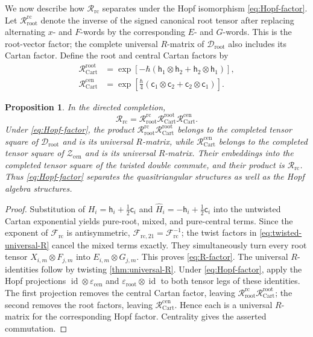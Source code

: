 \documentclass[11pt,a4paper]{article}
\newcommand{\ot}{\otimes}
\newcommand{\id}{\operatorname{id}}
\newcommand{\rc}{\mathrm{rc}}
\newcommand{\cen}{\mathrm{cen}}
\newcommand{\rootpart}{\mathrm{root}}
\newtheorem{proposition}[theorem]{Proposition}
\theoremstyle{definition}
\theoremstyle{remark}
\begin{document}
We now describe how \(\mathcal R_{\rc}\) separates under the Hopf
isomorphism \eqref{eq:Hopf-factor}.
Let \(\mathcal R_{\rootpart}^{\rc}\) denote the inverse of the signed
canonical root tensor after replacing alternating \(x\)- and \(F\)-words
by the corresponding \(E\)- and \(G\)-words.  This is the root-vector
factor; the complete universal \(R\)-matrix of
\(\mathcal D_{\rootpart}\) also includes its Cartan factor.
Define the root and central Cartan factors by
\[
\begin{aligned}
 \mathcal R_{\mathrm{Cart}}^{\rootpart}
 &=
 \exp\!\left[-\hbar(
 \mathsf h_1\ot\mathsf h_2+\mathsf h_2\ot\mathsf h_1)\right],\\
 \mathcal R_{\mathrm{Cart}}^{\cen}
 &=
 \exp\!\left[\frac{\hbar}{4}(
 \mathsf c_1\ot\mathsf c_2+\mathsf c_2\ot\mathsf c_1)\right].
\end{aligned}
\]

\begin{proposition}\label{prop:R-factor}
In the directed completion,
\begin{equation}\label{eq:R-factor}
 \mathcal R_{\rc}
 =
 \mathcal R_{\rootpart}^{\rc}
 \mathcal R_{\mathrm{Cart}}^{\rootpart}
 \mathcal R_{\mathrm{Cart}}^{\cen}.
\end{equation}
Under \eqref{eq:Hopf-factor}, the product
\(\mathcal R_{\rootpart}^{\rc}\mathcal R_{\mathrm{Cart}}^{\rootpart}\)
belongs to the completed tensor square of \(\mathcal D_{\rootpart}\)
and is its universal \(R\)-matrix, while
\(\mathcal R_{\mathrm{Cart}}^{\cen}\) belongs to the completed tensor
square of \(\mathcal Z_{\cen}\) and is its universal \(R\)-matrix.
Their embeddings into the completed tensor square of the twisted double
commute, and their product is \(\mathcal R_{\rc}\).
Thus \eqref{eq:Hopf-factor} separates the quasitriangular structures as
well as the Hopf algebra structures.
\end{proposition}

\begin{proof}
Substitution of
\(H_i=\mathsf h_i+\frac12\mathsf c_i\) and
\(\widehat H_i=-\mathsf h_i+\frac12\mathsf c_i\) into the untwisted
Cartan exponential yields pure-root, mixed, and pure-central terms.
Since the exponent of \(\mathcal F_{\rc}\) is antisymmetric,
\(\mathcal F_{\rc,21}=\mathcal F_{\rc}^{-1}\); the twist factors in
\eqref{eq:twisted-universal-R} cancel the mixed terms exactly.
They simultaneously turn every root tensor
\(X_{i,m}\ot F_{j,m}\) into \(E_{i,m}\ot G_{j,m}\).
This proves \eqref{eq:R-factor}.  The universal \(R\)-identities follow
by twisting \cref{thm:universal-R}.
Under \eqref{eq:Hopf-factor}, apply the Hopf projections
\(\id\ot\varepsilon_{\cen}\) and
\(\varepsilon_{\rootpart}\ot\id\) to both tensor legs of these
identities.  The first projection removes the central Cartan factor,
leaving \(\mathcal R_{\rootpart}^{\rc}
\mathcal R_{\mathrm{Cart}}^{\rootpart}\); the second removes the root
factors, leaving \(\mathcal R_{\mathrm{Cart}}^{\cen}\).
Hence each is a universal \(R\)-matrix for the corresponding Hopf
factor.  Centrality gives the asserted commutation.
\end{proof}
\end{document}

